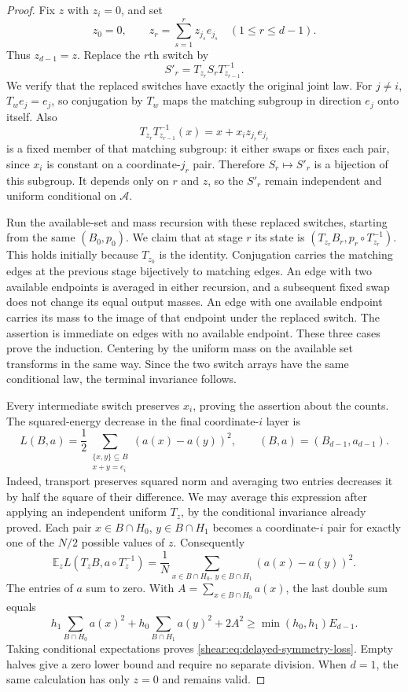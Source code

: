 \begin{proof}
Fix $z$ with $z_i=0$, and set
\[
 z_0=0,\qquad z_r=\sum_{s=1}^r z_{j_s}e_{j_s}
       \quad(1\le r\le d-1).
\]
Thus $z_{d-1}=z$. Replace the $r$th switch by
\[
 S'_r=T_{z_r}S_rT_{z_{r-1}}^{-1}.
\]
We verify that the replaced switches have exactly the original joint law.
For $j\ne i$, $T_w e_j=e_j$, so conjugation by $T_w$ maps the matching
subgroup in direction $e_j$ onto itself. Also
\[
 T_{z_r}T_{z_{r-1}}^{-1}(x)
   =x+x_i z_{j_r}e_{j_r}
\]
is a fixed member of that matching subgroup: it either swaps or fixes
each pair, since $x_i$ is constant on a coordinate-$j_r$ pair. Therefore
$S_r\mapsto S'_r$ is a bijection of this subgroup. It depends only on
$r$ and $z$, so the $S'_r$ remain independent and uniform conditional
on $\mathcal A$.

Run the available-set and mass recursion with these replaced switches,
starting from the same $(B_0,p_0)$. We claim that at stage $r$ its state is
$(T_{z_r}B_r,p_r\circ T_{z_r}^{-1})$. This holds initially because
$T_{z_0}$ is the identity. Conjugation carries the matching edges at the
previous stage bijectively to matching edges. An edge with two available
endpoints is averaged in either recursion, and a subsequent fixed swap
does not change its equal output masses. An edge with one available
endpoint carries its mass to the image of that endpoint under the
replaced switch. The assertion is immediate on edges with no available
endpoint. These three cases prove the induction. Centering by the
uniform mass on the available set transforms in the same way. Since
the two switch arrays have the same conditional law, the terminal
invariance follows.

Every intermediate switch preserves $x_i$, proving the assertion about
the counts. The squared-energy decrease in the final coordinate-$i$
layer is
\[
 L(B,a)=\frac12
 \sum_{\substack{\{x,y\}\subseteq B\\x+y=e_i}}
                 (a(x)-a(y))^2,
 \qquad (B,a)=(B_{d-1},a_{d-1}).
\]
Indeed, transport preserves squared norm and averaging two entries
decreases it by half the square of their difference. We may average
this expression after applying an independent uniform $T_z$, by the
conditional invariance already proved. Each pair
$x\in B\cap H_0$, $y\in B\cap H_1$ becomes a coordinate-$i$ pair
for exactly one of the $N/2$ possible values of $z$. Consequently
\[
 \mathbb E_z L(T_zB,a\circ T_z^{-1})
 =\frac1N\sum_{x\in B\cap H_0,\ y\in B\cap H_1}
                         (a(x)-a(y))^2.
\]
The entries of $a$ sum to zero. With
$A=\sum_{x\in B\cap H_0}a(x)$, the last double sum equals
\[
 h_1\sum_{B\cap H_0}a(x)^2+
 h_0\sum_{B\cap H_1}a(y)^2+2A^2
 \ge\min(h_0,h_1)E_{d-1}.
\]
Taking conditional expectations proves
\eqref{shear:eq:delayed-symmetry-loss}. Empty halves give a zero lower
bound and require no separate division. When $d=1$, the same calculation
has only $z=0$ and remains valid.
\end{proof}

